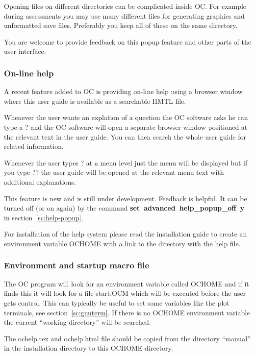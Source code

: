 \documentclass[11pt]{article}
\begin{document}
Opening files on different directories can be complicated inside OC.
For example during assessments you may use many different files for
generating graphics and unformatted save files.  Preferably you keep
all of these on the same directory.

You are welcome to provide feedback on this popup feature and other
parts of the user interface.

\hypertarget{Info helpsystem}{}
\subsubsection{On-line help}\label{sc:on-line-help}

A recent feature added to OC is providing on-line help using a browser
window where this user guide is available as a searchable HMTL file.

Whenever the user wants an explation of a question the OC software
asks he can type a ? and the OC software will open a separate browser
window positioned at the relevant text in the user guide.  You can then
search the whole user guide for related information.

Whenever the user types ? at a menu level just the menu will be
displayed but if you type ?? the user guide will be opened at the
relevant menu text with additional explanations.

This feature is new and is still under development. Feedback is
helpful.  It can be turned off (or on again) by the command {\bf
  set~advanced~help\_popup\_off~y} in section~\ref{sc:help-popup}.

For installation of the help system please read the installation guide
to create an environment variable OCHOME with a link to the directory
with the help file.

\subsubsection{Environment and startup macro file}

The OC program will look for an environment variable called OCHOME and
if it finds this it will look for a file start.OCM which will be
executed before the user gets control.  This can typically be useful
to set some variables like the plot terminals, see
section~\ref{sc:gnuterm}.  If there is no OCHOME environment variable
the current ``working directory'' will be searched.

The ochelp.tex and ochelp.html file should be copied from the
directory ``manual'' in the installation directory to this OCHOME
directory.
\end{document}
